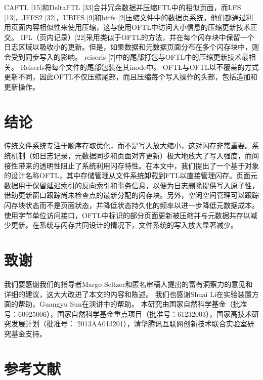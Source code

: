 CAFTL [15]和DeltaFTL [33]合并冗余数据并压缩FTL中的相似页面，而LFS [13]，JFFS2 [32]，UBIFS [9]和btrfs [2]压缩文件中的数据页系统。他们都通过利用页面内容相似性来使用压缩，这与使用OFTL中访问大小信息的压缩更新技术正交。 IPL（页内记录）[22]采用类似于OFTL的方法，并在每个闪存块中保留一个日志区域以吸收小的更新。但是，如果数据和元数据页面分布在多个闪存块中，则会受到同步写入的影响。 reiserfs [7]中的尾部打包与OFTL中的压缩更新技术最相关。 Reiserfs将每个文件的尾部包装在其inode中。 OFTL与OFTL以不覆盖的方式更新不同，因此OFTL不仅压缩尾部，而且压缩每个写入操作的头部，包括追加和更新操作。

\section{结论}
传统文件系统专注于顺序存取优化，而不是写入放大缩小，这对闪存非常重要。系统机制（如日志记录，元数据同步和页面对齐更新）极大地放大了写入强度，而间接性带来的透明性阻止了系统利用闪存特性。在本文中，我们提出了一个基于对象的设计名称OFTL，其中存储管理从文件系统卸载到FTL以直接管理闪存。页面元数据用于保留延迟索引的反向索引和事务信息，以便为日志删除提供写入原子性，借助更新窗口跟踪尚未检查点的最新分配的闪存块。另外，空闲空间管理可以跟踪闪存块状态而不是页面状态，并降低状态持久化的频率以进一步降低元数据成本。使用字节单位访问接口，OFTL中标识的部分页面更新被压缩并与元数据共存以减少更新。在系统与闪存共同设计的情况下，文件系统的写入放大显著减少。

\section*{致谢}
我们要感谢我们的指导者Margo Seltzer和匿名审稿人提出的富有洞察力的意见和详细的建议，这大大改进了本文的内容和陈述。 我们也感谢Shuai Li在实验装置方面的帮助，Guangyu Sun在演讲中的帮助。 本研究由国家自然科学基金（批准号：60925006），国家自然科学基金重点项目（批准号：61232003），国家高技术研究发展计划（批准号： 2013AA013201），清华腾讯互联网创新技术联合实验室研究基金支持。

\section*{参考文献}

